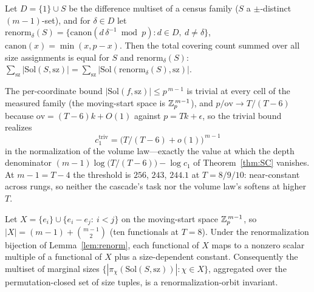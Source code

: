 \begin{lemma}\label{lem:renorm}
Let $D=\{1\}\cup S$ be the difference multiset of a census family ($S$
a $\pm$-distinct $(m-1)$-set), and for $\delta\in D$ let
$\mathrm{renorm}_\delta(S)=\{\mathrm{canon}(d\,\delta^{-1}\bmod p):
d\in D,\ d\ne\delta\}$, $\mathrm{canon}(x)=\min(x,p-x)$. Then the total
covering count summed over all size assignments is equal for $S$ and
$\mathrm{renorm}_\delta(S)$:
$\sum_{\mathrm{sz}}|\mathrm{Sol}(S,\mathrm{sz})|
=\sum_{\mathrm{sz}}|\mathrm{Sol}(\mathrm{renorm}_\delta(S),
\mathrm{sz})|$.
\end{lemma}

\begin{proposition}\label{prop:threshold}
The per-coordinate bound $|\mathrm{Sol}(f,\mathrm{sz})|\le p^{\,m-1}$
is trivial at every cell of the measured family (the
moving-start space is $\mathbb{Z}_p^{\,m-1}$), and $p/\mathrm{ov}\to T/(T-6)$
because $\mathrm{ov}=(T-6)k+O(1)$ against $p=Tk+\epsilon$, so the
trivial bound realizes
\[
c_1^{\mathrm{triv}}=\bigl(T/(T-6)+o(1)\bigr)^{\,m-1}
\]
in the normalization of the volume law---exactly the value at which
the depth denominator $(m-1)\log\bigl(T/(T-6)\bigr)-\log c_1$ of
Theorem~\ref{thm:SC} vanishes. At $m-1=T-4$ the threshold is $256$,
$243$, $244.1$ at $T=8/9/10$: near-constant across rungs, so neither
the cascade's task nor the volume law's softens at higher $T$.
\end{proposition}

\begin{lemma}\label{lem:char10}
Let $X=\{e_i\}\cup\{e_i-e_j:\ i<j\}$ on the moving-start space
$\mathbb{Z}_p^{\,m-1}$, so $|X|=(m-1)+\binom{m-1}{2}$ (ten functionals at
$T=8$). Under the renormalization bijection of Lemma~\ref{lem:renorm},
each functional of $X$ maps to a nonzero scalar multiple of a
functional of $X$ plus a size-dependent constant. Consequently the
multiset of marginal sizes
$\{|\pi_\chi(\mathrm{Sol}(S,\mathrm{sz}))|:\chi\in X\}$, aggregated
over the permutation-closed set of size tuples, is a
renormalization-orbit invariant.
\end{lemma}


